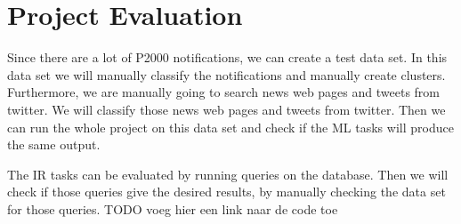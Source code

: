 \section{Project Evaluation}
Since there are a lot of P2000 notifications, we can create a test data set. 
In this data set we will manually classify the notifications and manually create clusters. 
Furthermore, we are manually going to search news web pages and tweets from twitter.
We will classify those news web pages and tweets from twitter. 
Then we can run the whole project on this data set  and check if the ML tasks will produce the same output.

The IR tasks can be evaluated by running queries on the database. 
Then we will check if those queries give the desired results, by manually checking the data set for those queries.
TODO voeg hier een link naar de code toe